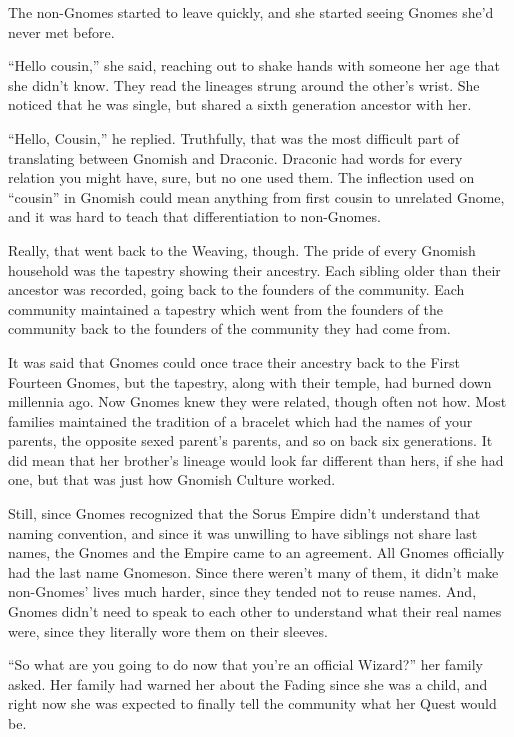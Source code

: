 \documentclass[12pt]{article}[titlepage]
\newcommand{\say}[1]{``#1''}
\renewcommand{\,}{\textsuperscript{,}}
\begin{document}
The non-Gnomes started to leave quickly, and she started seeing Gnomes she'd never met before.

\say{Hello cousin,} she said, reaching out to shake hands with someone her age that she didn't know.
They read the lineages strung around the other's wrist.
She noticed that he was single, but shared a sixth generation ancestor with her.

\say{Hello, Cousin,} he replied.
Truthfully, that was the most difficult part of translating between Gnomish and Draconic.
Draconic had words for every relation you might have, sure, but no one used them.
The inflection used on \say{cousin} in Gnomish could mean anything from first cousin to unrelated Gnome, and it was hard to teach that differentiation to non-Gnomes.

Really, that went back to the Weaving, though.
The pride of every Gnomish household was the tapestry showing their ancestry.
Each sibling older than their ancestor was recorded, going back to the founders of the community.
Each community maintained a tapestry which went from the founders of the community back to the founders of the community they had come from.

It was said that Gnomes could once trace their ancestry back to the First Fourteen Gnomes, but the tapestry, along with their temple, had burned down millennia ago.
Now Gnomes knew they were related, though often not how.
Most families maintained the tradition of a bracelet which had the names of your parents, the opposite sexed parent's parents, and so on back six generations.
It did mean that her brother's lineage would look far different than hers, if she had one, but that was just how Gnomish Culture worked.

Still, since Gnomes recognized that the Sorus Empire didn't understand that naming convention, and since it was unwilling to have siblings not share last names, the Gnomes and the Empire came to an agreement.
All Gnomes officially had the last name Gnomeson.
Since there weren't many of them, it didn't make non-Gnomes' lives much harder, since they tended not to reuse names.
And, Gnomes didn't need to speak to each other to understand what their real names were, since they literally wore them on their sleeves.

\say{So what are you going to do now that you're an official Wizard?} her family asked.
Her family had warned her about the Fading since she was a child, and right now she was expected to finally tell the community what her Quest would be.
\end{document}
